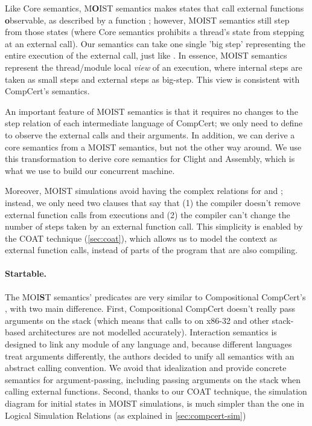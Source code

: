 Like Core semantics, M\textbf{O}IST semantics makes states that call external functions \textbf{o}bservable, as described by a function ; however, MOIST semantics still step from those states (where Core semantics prohibits a thread's state from stepping at an external call). Our semantics can take one single 'big step' representing the entire execution of the external call, just like \compcert. In essence, MOIST semantics represent the thread/module local \emph{view} of an execution, where internal steps are taken as small steps and external steps as big-step. This view is consistent with CompCert's semantics. 

An important feature of MOIST semantics is that it requires no changes to the step relation of each intermediate language of CompCert; we only need to define  to observe the external calls and their arguments. In addition, we can derive a core semantics from a MOIST semantics, %
but not the other way around. We use this transformation to derive core semantics for Clight and Assembly, which is what we use to build our concurrent machine.

Moreover, MOIST simulations avoid having the complex relations for  and ; instead, we only need two clauses that say that (1) the compiler doesn't remove external function calls from executions and (2) the compiler can't change the number of steps taken by an external function call. This simplicity is enabled by the COAT technique (\autoref{sec:coat}), which allows us to model the context as external function calls, instead of parts of the program that are also compiling. 

\paragraph{Startable.} The MOI\textbf{S}T semantics'  predicates are very similar to Compositional CompCert's , with two main difference. First, Compositional CompCert doesn't really pass arguments on the stack (which means that calls to  on x86-32 and other stack-based architectures are not modelled accurately). Interaction semantics \cite{bsda:esop2014} is designed to link any module of any language and, because different languages treat arguments differently, the authors decided to unify all semantics with an abstract calling convention. We avoid that idealization and provide concrete semantics for argument-passing, including passing arguments on the stack when calling external functions. Second, thanks to our COAT technique, the simulation diagram for initial states in MOIST simulations, is much simpler than the one in Logical Simulation Relations (as explained in \autoref{sec:compcert-sim})


